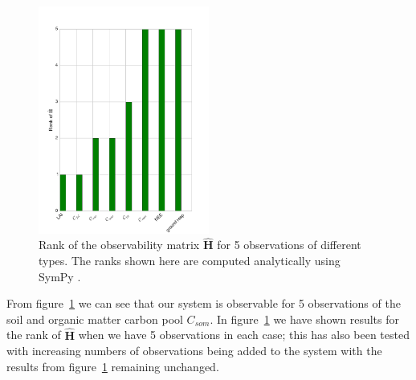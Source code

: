 \begin{figure}[ht]
    \centering
    \includegraphics[width=0.5\textwidth]{chapter/chapter5/dalec1_obsrank.pdf}
    \caption{Rank of the observability matrix $\hat{\textbf{H}}$ for 5 observations of different types. The ranks shown here are computed analytically using SymPy \citep{Joyner:2012:OSC:2110170.2110185}.}
    \label{chap5:fig:D1_observability}
\end{figure}

From figure~\ref{chap5:fig:D1_observability} we can see that our system is observable for 5 observations of the soil and organic matter carbon pool $C_{som}$. In figure~\ref{chap5:fig:D1_observability} we have shown results for the rank of  $\hat{\textbf{H}}$ when we have 5 observations in each case; this has also been tested with increasing numbers of observations being added to the system with the results from figure~\ref{chap5:fig:D1_observability} remaining unchanged. 

